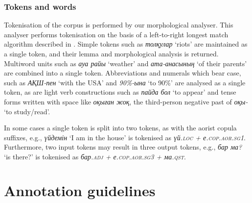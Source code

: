 \documentclass[a4paper,11pt, onecolumn,twoside]{article}
\newcommand{\gmk}[1]{{\rm {\ll \textsc{#1}}}}
\newcommand{\kazakh}[1]{{\em #1}}
\newcommand{\gloss}[1]{`#1'}
\begin{document}

\subsubsection{Tokens and words}

Tokenisation of the corpus is performed by our morphological analyser. This analyser
performs tokenisation on the basis of a left-to-right longest match algorithm described
in \textcite{garrido02}. Simple tokens such as \kazakh{толқулар} \gloss{riots} are maintained
as a single token, and their lemma and morphological analysis is returned. Multiword
units such as \kazakh{ауа райы} \gloss{weather} and \kazakh{ата-анасының} \gloss{of their parents} are combined
into a single token. Abbreviations and numerals which bear case, such as \kazakh{АҚШ-пен} \gloss{with the USA}
and \kazakh{90\%-ына} \gloss{to 90\%} are analysed as a single token, as are light verb constructions such as
\kazakh{пайда бол} \gloss{to appear} and tense forms written with space like \kazakh{оқыған жоқ},
the third-person negative past of \kazakh{оқы-} \gloss{to study/read}.

In some cases a single token is split into two tokens, as with the aorist copula suffixes,
e.g., \kazakh{үйдемін} \gloss{I am in the house} is tokenised as \kazakh{үй.\gmk{loc} + е.\gmk{cop.aor.sg1}}. Furthermore,
two input tokens may result in three output tokens, e.g., \kazakh{бар ма?} \gloss{is there?} is
tokenised as \kazakh{бар.\gmk{adj} + е.\gmk{cop.aor.sg3} + ма.\gmk{qst}}.



\section{Annotation guidelines}\label{sec:annotation}


\end{document}
